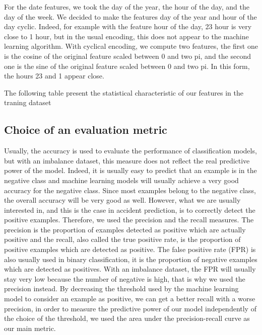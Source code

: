 \documentclass[conference]{IEEEtran}
\begin{document}
For the date features, we took the day of the year, the hour of the day, and the day of the week. We decided to make the features day of the year and hour of the day cyclic. Indeed, for example with the feature hour of the day, 23 hour is very close to 1 hour, but in the usual encoding, this does not appear to the machine learning algorithm. With cyclical encoding, we compute two features, the first one is the cosine of the original feature scaled between 0 and two pi, and the second one is the sine of the original feature scaled between 0 and two pi. In this form, the hours 23 and 1 appear close.

The following table present the statistical characteristic of our features in the traning dataset 

\subsection{Choice of an evaluation metric}
Usually, the accuracy is used to evaluate the performance of classification models, but with an imbalance dataset, this measure does not reflect the real predictive power of the model. Indeed, it is usually easy to predict that an example is in the negative class and machine learning models will usually achieve a very good accuracy for the negative class. Since most examples belong to the negative class, the overall accuracy will be very good as well. However, what we are usually interested in, and this is the case in accident prediction, is to correctly detect the positive examples.
Therefore, we used the precision and the recall measures. The precision is the proportion of examples detected as positive which are actually positive and the recall, also called the true positive rate, is the proportion of positive examples which are detected as positive. The false positive rate (FPR) is also usually used in binary classification, it is the proportion of negative examples which are detected as positives. With an imbalance dataset, the FPR will usually stay very low because the number of negative is high, that is why we used the precision instead.
By decreasing the threshold used by the machine learning model to consider an example as positive, we can get a better recall with a worse precision, in order to measure the predictive power of our model independently of the choice of the threshold, we used the area under the precision-recall curve as our main metric.
\end{document}
